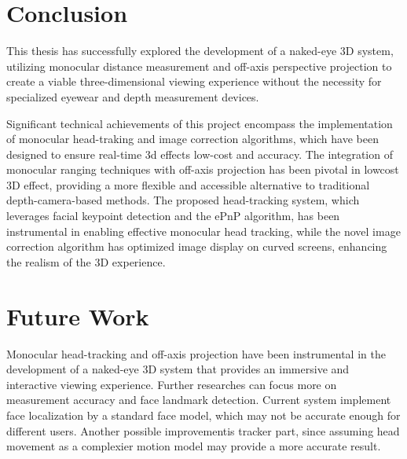 
\section{Conclusion}
This thesis has successfully explored the development of a naked-eye 3D system, utilizing monocular distance measurement and off-axis perspective projection to create a viable three-dimensional viewing experience without the necessity for specialized eyewear and depth measurement devices. 

Significant technical achievements of this project encompass the implementation of monocular head-traking and image correction algorithms, which have been designed to ensure real-time 3d effects low-cost and accuracy. The integration of monocular ranging techniques with off-axis projection has been pivotal in lowcost 3D effect, providing a more flexible and accessible alternative to traditional depth-camera-based methods. The proposed head-tracking system, which leverages facial keypoint detection and the ePnP algorithm, has been instrumental in enabling effective monocular head tracking, while the novel image correction algorithm has optimized image display on curved screens, enhancing the realism of the 3D experience.

\section{Future Work}
Monocular head-tracking and off-axis projection have been instrumental in the development of a naked-eye 3D system that provides an immersive and interactive viewing experience. Further researches can focus more on measurement accuracy and face landmark detection. Current system implement face localization by a standard face model, which may not be accurate enough for different users. Another possible improvementis tracker part, since assuming head movement as a complexier motion model may provide a more accurate result.

\clearpage

